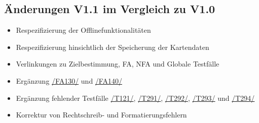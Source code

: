 \subsection*{Änderungen V1.1 im Vergleich zu V1.0}

\begin{itemize}
    \item Respezifizierung der Offlinefunktionalitäten
    \item Respezifizierung hinsichtlich der Speicherung der Kartendaten
    \item Verlinkungen zu Zielbestimmung, FA, NFA und Globale Testfälle 
    \item Ergänzung \hyperref[/FA130/]{/FA130/} und \hyperref[/FA140/]{/FA140/}
    \item Ergänzung fehlender Testfälle \hyperref[/T121/]{/T121/}, \hyperref[/T291/]{/T291/}, \hyperref[/T292/]{/T292/}, \hyperref[/T293/]{/T293/} und \hyperref[/T294/]{/T294/}
    \item Korrektur von Rechtschreib- und Formatierungsfehlern
\end{itemize}